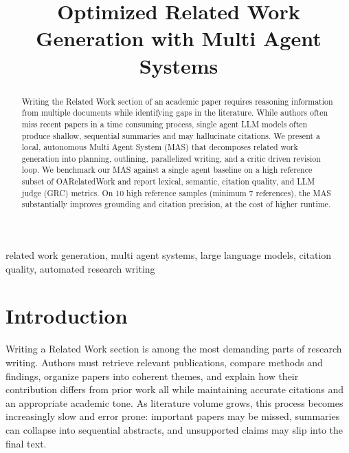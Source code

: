 \documentclass[conference]{IEEEtran}
\begin{document}
\title{Optimized Related Work Generation with Multi Agent Systems}

\author{
\and
{}
\and
{}
}

\maketitle

\thispagestyle{firstpage}

\begin{abstract}
Writing the Related Work section of an academic paper requires reasoning information from multiple documents while identifying gaps in the literature. While authors often miss recent papers in a time consuming process, single agent LLM models often produce shallow, sequential summaries and may hallucinate citations. We present a local, autonomous Multi Agent System (MAS) that decomposes related work generation into planning, outlining, parallelized writing, and a critic driven revision loop. We benchmark our MAS against a single agent baseline on a high reference subset of OARelatedWork and report lexical, semantic, citation quality, and LLM judge (GRC) metrics. On 10 high reference samples (minimum 7 references), the MAS substantially improves grounding and citation precision, at the cost of higher runtime.
\end{abstract}

\begin{IEEEkeywords}
related work generation, multi agent systems, large language models, citation quality, automated research writing
\end{IEEEkeywords}

\section{Introduction}
Writing a Related Work section is among the most demanding parts of research writing. Authors must retrieve relevant publications, compare methods and findings, organize papers into coherent themes, and explain how their contribution differs from prior work all while maintaining accurate citations and an appropriate academic tone. As literature volume grows, this process becomes increasingly slow and error prone: important papers may be missed, summaries can collapse into sequential abstracts, and unsupported claims may slip into the final text.
\end{document}
